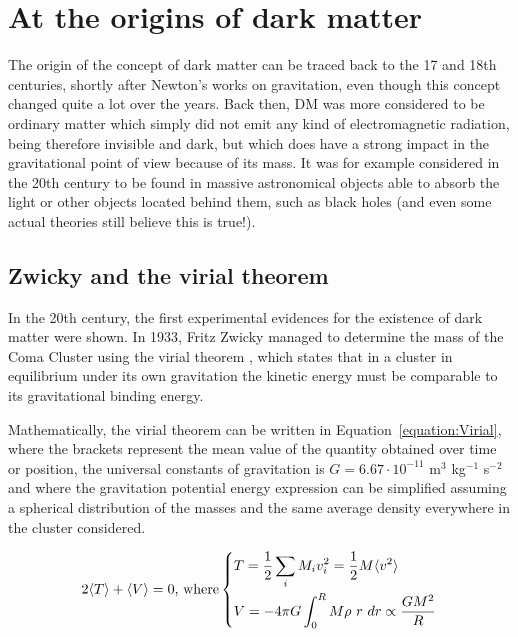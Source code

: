 \documentclass[a4paper, 10pt, openright]{report}
\begin{document}
\section{At the origins of dark matter} \label{section:DMOrigins}

The origin of the concept of dark matter can be traced back to the 17 and 18th centuries, shortly after Newton's works on gravitation, even though this concept changed quite a lot over the years. Back then, \ac{DM} was more considered to be ordinary matter which simply did not emit any kind of electromagnetic radiation, being therefore invisible and dark, but which does have a strong impact in the gravitational point of view because of its mass. It was for example considered in the 20th century to be found in massive astronomical objects able to absorb the light or other objects located behind them, such as black holes (and even some actual theories still believe this is true!).

\subsection{Zwicky and the virial theorem}

In the 20th century, the first experimental evidences for the existence of dark matter were shown. In 1933, Fritz Zwicky managed to determine the mass of the Coma Cluster using the virial theorem \cite{Zwicky}, which states that in a cluster in equilibrium under its own gravitation the kinetic energy must be comparable to its gravitational binding energy. 

Mathematically, the virial theorem can be written in Equation~\ref{equation:Virial}, where the brackets represent the mean value of the quantity obtained over time or position, the universal constants of gravitation is $G = 6.67 \cdot 10^{-11}$ m$^3$ kg$^{-1}$ s$^{-2}$ and where the gravitation potential energy expression can be simplified assuming a spherical distribution of the masses and the same average density everywhere in the cluster considered.

\begin{equation} \label{equation:Virial}
2 \langle T \rangle + \langle V \rangle = 0 \text{, where}
\begin{dcases}
T = \frac{1}{2} \sum_i M_i v_i^2 = \frac{1}{2} M \langle v^2 \rangle\\
V = -4 \pi G \int_0^R M \rho \text{ } r \text{ } dr \propto \frac{G M^2}{R}
\end{dcases}
\end{equation}
\end{document}

